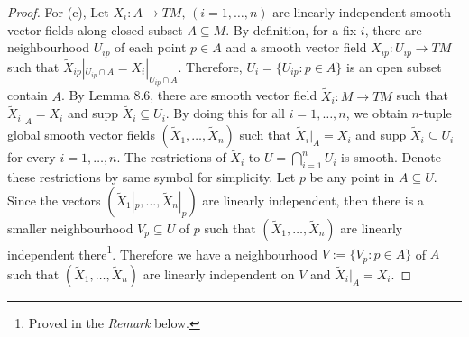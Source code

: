 \documentclass[a4paper]{article}
\theoremstyle{remark}
\newcommand{\subhim}{\subseteq} %
\begin{document}
\begin{proof}
For (c), Let $X_i : A \to TM,\, (i=1,\dots,n)$ are linearly independent smooth vector fields along closed subset $A \subhim M$. By definition, for a fix $i$, there are neighbourhood $U_{ip}$ of each point $p \in A$ and a smooth vector field $\widetilde{X}_{ip} : U_{ip} \to TM$ such that $\widetilde{X}_{ip}|_{U_{ip}\cap A} = X_i|_{U_{ip}\cap A}$. Therefore, $U_i = \{U_{ip} : p \in A \}$ is an open subset contain $A$. By Lemma 8.6, there are smooth vector field $\widetilde{X}_i : M \to TM$ such that $\widetilde{X}_i|_A = X_i$ and supp $\widetilde{X}_i \subhim U_i$. By doing this for all $i=1,\dots,n$, we obtain $n$-tuple global smooth vector fields $(\widetilde{X}_1,\dots,\widetilde{X}_n)$ such that $\widetilde{X}_i|_A = X_i$ and supp $\widetilde{X}_i \subhim U_i$ for every $i =1,\dots,n$. The restrictions of $\widetilde{X}_i$ to $U = \bigcap_{i=1}^n U_i$ is smooth. Denote these restrictions by same symbol for simplicity. Let $p$ be any point in $A\subhim U$. Since the vectors $(\widetilde{X}_1|_p,\dots,\widetilde{X}_n|_p)$ are linearly independent, then there is a smaller neighbourhood $V_p \subhim U$ of $p$ such that $(\widetilde{X}_1,\dots,\widetilde{X}_n)$ are linearly independent there\footnote[2]{Proved in the \textit{Remark} below.}. Therefore we have a neighbourhood $V := \{V_p : p\in A \} $ of $A$ such that $(\widetilde{X}_1,\dots,\widetilde{X}_n)$ are linearly independent on $V$ and $\widetilde{X}_i|_A = X_i$.
\end{proof}
\end{document}
